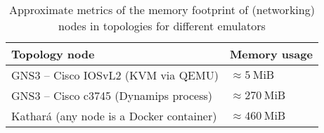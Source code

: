 \begin{table}
  \centering
  \small
  \begin{tabulary}{0.9\textwidth}{ll}
    \toprule
      \textbf{Topology node}                   & \textbf{Memory usage}\\
    \midrule
      GNS3 -- Cisco IOSvL2 (KVM via QEMU)      & $\approx 5~\mbox{MiB}$\\
      GNS3 -- Cisco c3745 (Dynamips process)   & $\approx 270~\mbox{MiB}$\\
      Kathará (any node is a Docker container) & $\approx 460~\mbox{MiB}$\\
    \bottomrule
  \end{tabulary}
  \caption{%
    Approximate metrics of the memory footprint of (networking) nodes in topologies for different emulators
  }
  \label{tab:comparativeramusage}
\end{table}
